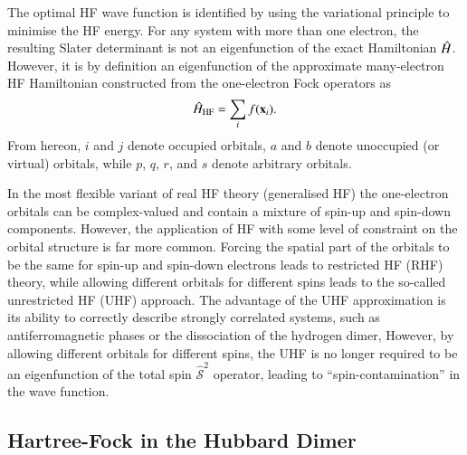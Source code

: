 \documentclass[aps,prb,reprint,noshowkeys,linenumbers,superscriptaddress]{revtex4-1}
\newcommand{\hH}{\Hat{H}}
\begin{document}
The optimal HF wave function is identified by using the variational principle to minimise the HF energy.
For any system with more than one electron, the resulting Slater determinant is not an eigenfunction of the exact Hamiltonian $\hH$. 
However, it is by definition an eigenfunction of the approximate many-electron HF Hamiltonian constructed 
from the one-electron Fock operators as
\begin{equation}\label{eq:HFHamiltonian}
	\hH_{\text{HF}} = \sum_{i} f(\vb{x}_i).
\end{equation}
From hereon, $i$ and $j$ denote occupied orbitals, $a$ and $b$ denote unoccupied (or virtual) orbitals, while $p$, $q$, $r$, and $s$ denote arbitrary orbitals.

In the most flexible variant of real HF theory (generalised HF) the one-electron orbitals can be complex-valued
and contain a mixture of spin-up and spin-down components.\cite{Mayer_1993,Jimenez-Hoyos_2011}
However, the application of HF with some level of constraint on the orbital structure is far more common.
Forcing the spatial part of the orbitals to be the same for spin-up and spin-down electrons leads to restricted HF (RHF) theory, 
while allowing different orbitals for different spins leads to the so-called unrestricted HF (UHF) approach.\cite{StuberPaldus}
The advantage of the UHF approximation is its ability to correctly describe strongly correlated systems, 
such as antiferromagnetic phases\cite{Slater_1951} or the dissociation of the hydrogen dimer,\cite{Coulson_1949}
However, by allowing different orbitals for different spins, the UHF is no longer required to be an eigenfunction of 
the total spin $\hat{\mathcal{S}}^2$ operator, leading to ``spin-contamination'' in the wave function.

\subsection{Hartree-Fock in the Hubbard Dimer}
\label{sec:HF_hubbard}
\end{document}
